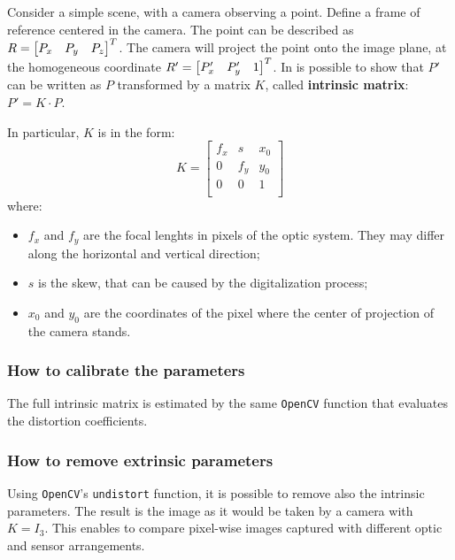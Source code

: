 Consider a simple scene, with a camera observing a point.
Define a frame of reference centered in the camera.
The point can be described as $R=\begin{bmatrix} P_x & P_y & P_z \end{bmatrix}^T$.
The camera will project the point onto the image plane, at the homogeneous coordinate $R'=\begin{bmatrix} P_x' & P_y' & 1 \end{bmatrix}^T$.
In is possible to show that $P'$ can be written as $P$ transformed by a matrix $K$, called \textbf{intrinsic matrix}: $P' = K{\cdot}P$.

In particular, $K$ is in the form:
\begin{equation}
	K = \begin{bmatrix}
		f_x & s   & x_0 \\
		0   & f_y & y_0 \\
		0   & 0   & 1   \\
	\end{bmatrix}
\end{equation}
where:
\begin{itemize}
	\itemsep 0em
	\item $f_x$ and $f_y$ are the focal lenghts in pixels of the optic system. They may differ along the horizontal and vertical direction;
	\item $s$ is the skew, that can be caused by the digitalization process;
	\item $x_0$ and $y_0$ are the coordinates of the pixel where the center of projection of the camera stands.
\end{itemize}

\subsubsection{How to calibrate the parameters}

The full intrinsic matrix is estimated by the same \texttt{OpenCV} function that evaluates the distortion coefficients.

\subsubsection{How to remove extrinsic parameters}
Using \texttt{OpenCV}'s \texttt{undistort} function, it is possible to remove also the intrinsic parameters.
The result is the image as it would be taken by a camera with $K{=}I_3$.
This enables to compare pixel-wise images captured with different optic and sensor arrangements.


